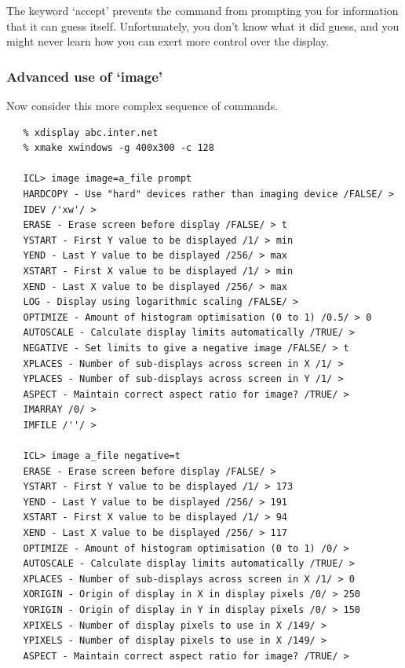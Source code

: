 \documentclass[11pt,twoside]{article}
\begin{document}
   The keyword `accept' prevents the command from prompting you for
   information that it can guess itself. Unfortunately, you don't know
   what it did guess, and you might never learn how you can exert more
   control over the display.


\subsubsection{\label{lookimagadvanced}Advanced use of `image'}

   Now consider this more complex sequence of commands.

\begin{verbatim}
   % xdisplay abc.inter.net
   % xmake xwindows -g 400x300 -c 128

   ICL> image image=a_file prompt
   HARDCOPY - Use "hard" devices rather than imaging device /FALSE/ >
   IDEV /'xw'/ >
   ERASE - Erase screen before display /FALSE/ > t
   YSTART - First Y value to be displayed /1/ > min
   YEND - Last Y value to be displayed /256/ > max
   XSTART - First X value to be displayed /1/ > min
   XEND - Last X value to be displayed /256/ > max
   LOG - Display using logarithmic scaling /FALSE/ >
   OPTIMIZE - Amount of histogram optimisation (0 to 1) /0.5/ > 0
   AUTOSCALE - Calculate display limits automatically /TRUE/ >
   NEGATIVE - Set limits to give a negative image /FALSE/ > t
   XPLACES - Number of sub-displays across screen in X /1/ >
   YPLACES - Number of sub-displays across screen in Y /1/ >
   ASPECT - Maintain correct aspect ratio for image? /TRUE/ >
   IMARRAY /0/ >
   IMFILE /''/ >

   ICL> image a_file negative=t
   ERASE - Erase screen before display /FALSE/ >
   YSTART - First Y value to be displayed /1/ > 173
   YEND - Last Y value to be displayed /256/ > 191
   XSTART - First X value to be displayed /1/ > 94
   XEND - Last X value to be displayed /256/ > 117
   OPTIMIZE - Amount of histogram optimisation (0 to 1) /0/ >
   AUTOSCALE - Calculate display limits automatically /TRUE/ >
   XPLACES - Number of sub-displays across screen in X /1/ > 0
   XORIGIN - Origin of display in X in display pixels /0/ > 250
   YORIGIN - Origin of display in Y in display pixels /0/ > 150
   XPIXELS - Number of display pixels to use in X /149/ >
   YPIXELS - Number of display pixels to use in X /149/ >
   ASPECT - Maintain correct aspect ratio for image? /TRUE/ >
\end{verbatim}
\end{document}
